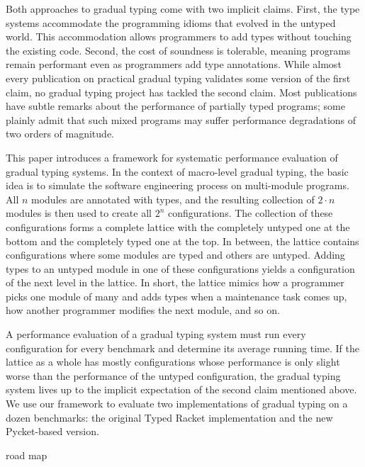 \documentclass[preprint,10pt,english]{sigplanconf}
\begin{document}
Both approaches to gradual typing come with two implicit claims. First, the
 type systems accommodate the programming idioms that evolved in the
 untyped world. This accommodation allows programmers to add types without
 touching the existing code. Second, the cost of soundness is tolerable,
 meaning programs remain performant even as programmers add type
 annotations. While almost every publication on practical gradual typing
 validates some version of the first claim, no gradual typing project has
 tackled the second claim. Most publications have subtle remarks about the
 performance of partially typed programs; some plainly admit that such
 mixed programs may suffer performance degradations of two orders of
 magnitude. 

This paper introduces a framework for systematic performance evaluation of
 gradual typing systems. In the context of macro-level gradual typing, the
 basic idea is to simulate the software engineering process on multi-module
 programs. All $n$ modules are annotated with types, and the resulting
 collection of $2 \cdot n$ modules is then used to create all $2^n$
 configurations. The collection of these configurations forms a complete
 lattice with the completely untyped one at the bottom and the completely
 typed one at the top. In between, the lattice contains configurations
 where some modules are typed and others are untyped. Adding types to an
 untyped module in one of these configurations yields a configuration of
 the next level in the lattice. In short, the lattice mimics how a
 programmer picks one module of many and adds types when a maintenance task
 comes up, how another programmer modifies the next module, and so on. 

A performance evaluation of a gradual typing system must run every
 configuration for every benchmark and determine its average running
 time. If the lattice as a whole has mostly configurations whose
 performance is only slight worse than the performance of the untyped
 configuration, the gradual typing system lives up to the implicit
 expectation of the second claim mentioned above.  We use our framework to
 evaluate two implementations of gradual typing on a dozen benchmarks: the
 original Typed Racket implementation and the new Pycket-based version.

\vspace{2in}
road map
\vspace{2in}



















\end{document}
